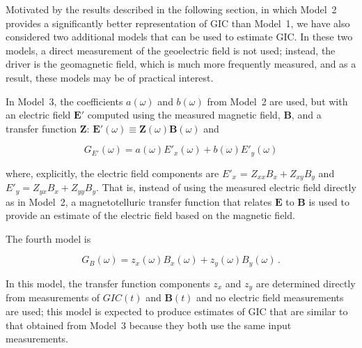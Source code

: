 \documentclass[draft,linenumbers]{agujournal2018}
\begin{document}
Motivated by the results described in the following section, in which Model~2 provides a significantly better representation of GIC than Model~1, we have also considered two additional models that can be used to estimate GIC. In these two models, a direct measurement of the geoelectric field is not used; instead, the driver is the geomagnetic field, which is much more frequently measured, and as a result, these models may be of practical interest.

In Model~3, the coefficients $a(\omega)$ and $b(\omega)$ from Model~2 are used, but with an electric field $\mathbf{E}'$ computed using the measured magnetic field, $\mathbf{B}$, and a transfer function $\boldsymbol{Z}$: $\mathbf{E}'(\omega) \equiv \boldsymbol{Z}(\omega)\mathbf{B}(\omega)$ and

\setcounter{equation}{2}
\begin{linenomath*}
\begin{equation}
G_{E'}(\omega) = a(\omega)E'_x(\omega) + b(\omega)E'_y(\omega)
\label{model3}
\end{equation}
\end{linenomath*}

\noindent
where, explicitly, the electric field components are $E'_x$ = $Z_{xx}B_x + Z_{xy}B_y$ and $E'_y = Z_{yx}B_x + Z_{yy}B_y$. 
That is, instead of using the measured electric field directly as in Model~2, a magnetotelluric transfer function that relates $\mathbf{E}$ to $\mathbf{B}$ is used to provide an estimate of the electric field based on the magnetic field.

The fourth model is

\begin{linenomath*}
\begin{equation}
G_B(\omega) = z_x(\omega)B_x(\omega) + z_y(\omega)B_y(\omega)\,.
\label{model4}
\end{equation}
\end{linenomath*}

\noindent
In this model, the transfer function components $z_x$ and $z_y$ are determined directly from measurements of $GIC(t)$ and $\mathbf{B}(t)$ and no electric field measurements are used; this model is expected to produce estimates of GIC that are similar to that obtained from Model~3 because they both use the same input measurements.
\end{document}
